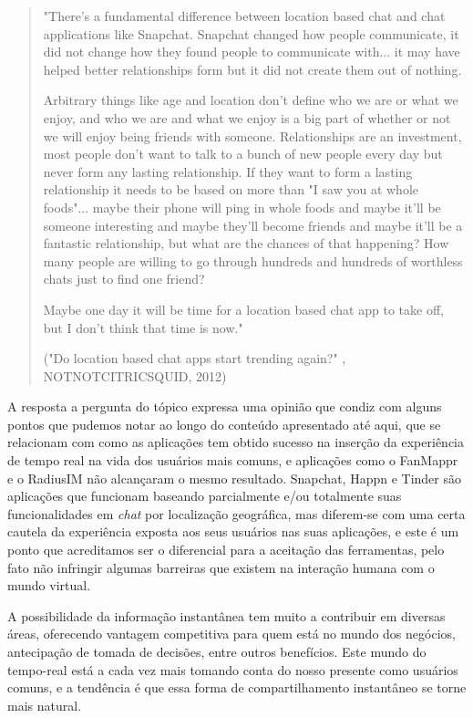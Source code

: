 \begin{quote}
	\small "There's a fundamental difference between location based chat and chat applications like Snapchat. Snapchat changed how people communicate, it did not change how they found people to communicate with... it may have helped better relationships form but it did not create them out of nothing.
	
	Arbitrary things like age and location don't define who we are or what we enjoy, and who we are and what we enjoy is a big part of whether or not we will enjoy being friends with someone. Relationships are an investment, most people don't want to talk to a bunch of new people every day but never form any lasting relationship. If they want to form a lasting relationship it needs to be based on more than "I saw you at whole foods"... maybe their phone will ping in whole foods and maybe it'll be someone interesting and maybe they'll become friends and maybe it'll be a fantastic relationship, but what are the chances of that happening? How many people are willing to go through hundreds and hundreds of worthless chats just to find one friend?
	
	Maybe one day it will be time for a location based chat app to take off, but I don't think that time is now." 
	
	("Do location based chat apps start trending again?" \cite{notnotcitricsquid}, NOTNOTCITRICSQUID, 2012)
\end{quote}

A resposta a pergunta do tópico expressa uma opinião que condiz com alguns pontos que pudemos notar ao longo do conteúdo apresentado até aqui, que se relacionam com como as aplicações tem obtido sucesso na inserção da experiência de tempo real na vida dos usuários mais comuns, e aplicações como o FanMappr e o RadiusIM não alcançaram o mesmo resultado. Snapchat, Happn e Tinder são aplicações que funcionam baseando parcialmente e/ou totalmente suas funcionalidades em \textit{chat} por localização geográfica, mas diferem-se com uma certa cautela da experiência exposta aos seus usuários nas suas aplicações, e este é um ponto que acreditamos ser o diferencial para a aceitação das ferramentas, pelo fato não infringir algumas barreiras que existem na interação humana com o mundo virtual.

A possibilidade da informação instantânea tem muito a contribuir em diversas áreas, oferecendo vantagem competitiva para quem está no mundo dos negócios, antecipação de tomada de decisões, entre outros benefícios. Este mundo do tempo-real está a cada vez mais tomando conta do nosso presente como usuários comuns, e a tendência é que essa forma de compartilhamento instantâneo se torne mais natural.

